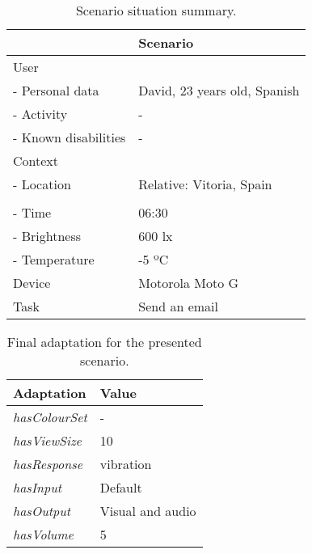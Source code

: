 \begin{table}
 \caption{Scenario situation summary.}
 \label{tbl:polisher_scenario}
 \footnotesize
 \centering
\begin{tabular}{l l}
  \hline 
				& \textbf{Scenario}		\\
  \hline
  User \\
  \qquad - Personal data 	& David, 23 years old, Spanish 	\\
  \qquad - Activity	 	& - 				\\
  \qquad - Known disabilities 	& - 				\\
  Context \\
  \qquad - Location 		& Relative: Vitoria, Spain  	\\
				& 				\\
  \qquad - Time			& 06:30 			\\
  \qquad - Brightness		& 600 \ac{lx} 			\\
  \qquad - Temperature		& -5 ºC 			\\
  Device 			& Motorola Moto G 	 	\\
  \hline
  Task				& Send an email			\\
  \hline
\end{tabular}
\end{table}

\begin{table}
 \caption{Final adaptation for the presented scenario.}
 \label{tbl:polisher_adaptation}
 \footnotesize
 \centering
\begin{tabular}{l l}
  \hline 
    \textbf{Adaptation} 	& \textbf{Value}\\
    \hline
    \textit{hasColourSet}	& -		\\
    \textit{hasViewSize}	& 10		\\
    \textit{hasResponse}	& vibration	\\
    \textit{hasInput}		& Default	\\
    \textit{hasOutput}		& Visual and audio\\
    \textit{hasVolume}		& 5 		\\
  \hline
\end{tabular}
\end{table}

